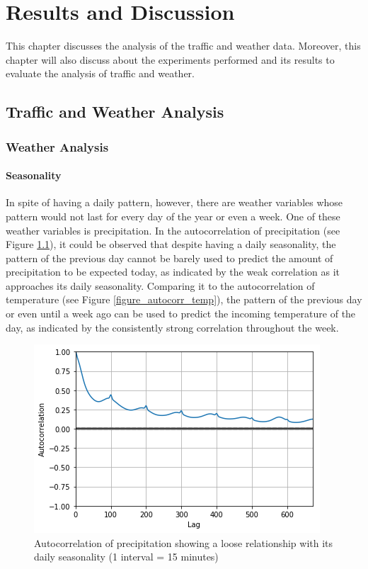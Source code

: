 \chapter{Results and Discussion}

This chapter discusses the analysis of the traffic and weather data. Moreover, this chapter will also discuss about the experiments performed and its results to evaluate the analysis of traffic and weather.

\section{Traffic and Weather Analysis}

\subsection{Weather Analysis}

\subsubsection{Seasonality}

In spite of having a daily pattern, however, there are weather variables whose pattern would not last for every day of the year or even a week. One of these weather variables is precipitation. In the autocorrelation of precipitation (see Figure \ref{figure_autocorr_precip}), it could be observed that despite having a daily seasonality, the pattern of the previous day cannot be barely used to predict the amount of precipitation to be expected today, as indicated by the weak correlation as it approaches its daily seasonality. Comparing it to the autocorrelation of temperature (see Figure \ref{figure_autocorr_temp}), the pattern of the previous day or even until a week ago can be used to predict the incoming temperature of the day, as indicated by the consistently strong correlation throughout the week.


\begin{figure}
  \includegraphics[width=\linewidth]
  {figures/figure_autocorr_precip.png}
  \caption{ Autocorrelation of precipitation showing a loose relationship with its daily seasonality (1 interval = 15 minutes)}
  \label{figure_autocorr_precip}
\end{figure}


